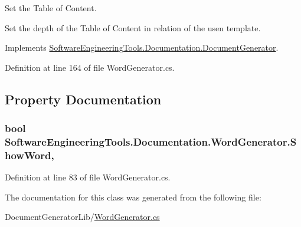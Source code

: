 Set the Table of Content. 

Set the depth of the Table of Content in relation of the usen template. 

Implements \hyperlink{class_software_engineering_tools_1_1_documentation_1_1_document_generator_af39f74148f77d9e036a9a3b284c4d569}{Software\+Engineering\+Tools.\+Documentation.\+Document\+Generator}.



Definition at line 164 of file Word\+Generator.\+cs.



\subsection{Property Documentation}
\hypertarget{class_software_engineering_tools_1_1_documentation_1_1_word_generator_a56054cd420c6dc071f83b05bf9cb1dc3}{
\subsubsection[{Show\+Word}]{\setlength{\rightskip}{0pt plus 5cm}bool Software\+Engineering\+Tools.\+Documentation.\+Word\+Generator.\+Show\+Word\hspace{0.3cm}{\ttfamily [get]}, {\ttfamily [set]}}}\label{class_software_engineering_tools_1_1_documentation_1_1_word_generator_a56054cd420c6dc071f83b05bf9cb1dc3}


Definition at line 83 of file Word\+Generator.\+cs.



The documentation for this class was generated from the following file\+:\begin{DoxyCompactItemize}
\item 
Document\+Generator\+Lib/\hyperlink{_word_generator_8cs}{Word\+Generator.\+cs}\end{DoxyCompactItemize}
